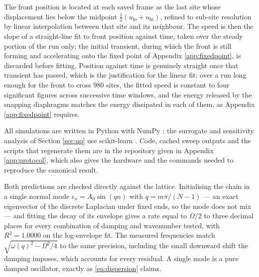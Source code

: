 The front position is located at each saved frame as the last site whose
displacement lies below the midpoint $\tfrac12(u_{\text{lo}} + u_{\text{hi}})$,
refined to sub-site resolution by linear interpolation between that site and its
neighbour. The speed is then the slope of a straight-line fit to front position
against time, taken over the steady portion of the run only; the initial transient,
during which the front is still forming and accelerating onto the fixed point of
Appendix \ref{app:fixedpoint}, is discarded before fitting. Position against time
is genuinely straight once that transient has passed, which is the justification
for the linear fit: over a run long enough for the front to cross $980$ sites, the
fitted speed is constant to four significant figures across successive time
windows, and the energy released by the snapping diaphragms matches the energy
dissipated in each of them, as Appendix \ref{app:fixedpoint} requires.

All simulations are written in Python with NumPy \cite{harris2020numpy}; the
surrogate and sensitivity analysis of Section \ref{sec:uq} use scikit-learn
\cite{pedregosa2011scikit}. Code, cached sweep outputs and the scripts that
regenerate them are in the repository given in Appendix \ref{app:protocol}, which
also gives the hardware and the commands needed to reproduce the canonical result.



Both predictions are checked directly against the lattice. Initialising the chain
in a single normal mode $\epsilon_n = A_0\sin(qn)$ with $q = m\pi/(N-1)$ --- an
exact eigenvector of the discrete Laplacian under fixed ends, so the mode does not
mix --- and fitting the decay of its envelope gives a rate equal to $\Omega/2$ to
three decimal places for every combination of damping and wavenumber tested, with
$R^2 = 1.0000$ on the log-envelope fit. The measured frequencies match
$\sqrt{\omega(q)^2 - \Omega^2/4}$ to the same precision, including the small
downward shift the damping imposes, which accounts for every residual. A single
mode is a pure damped oscillator, exactly as \eqref{eq:dispersion} claims.

